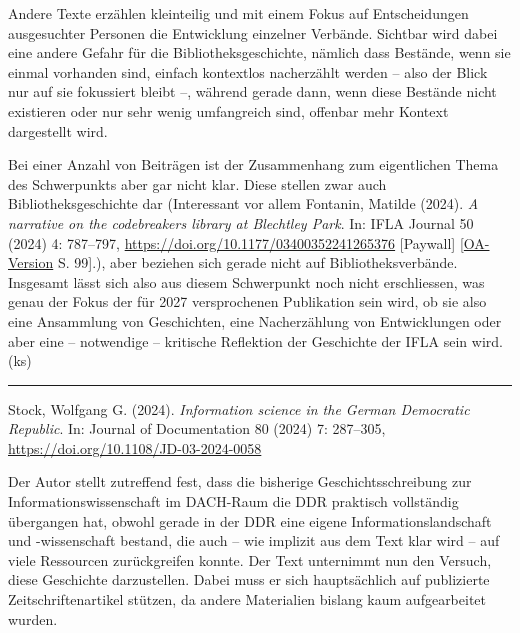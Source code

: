 \documentclass[a4paper,
fontsize=11pt,
oneside,
numbers=noperiodatend,
parskip=half-,
bibliography=totoc,
final
]{scrartcl}
\begin{document}
Andere Texte erzählen kleinteilig und mit einem Fokus auf Entscheidungen
ausgesuchter Personen die Entwicklung einzelner Verbände. Sichtbar wird
dabei eine andere Gefahr für die Bibliotheksgeschichte, nämlich dass
Bestände, wenn sie einmal vorhanden sind, einfach kontextlos nacherzählt
werden -- also der Blick nur auf sie fokussiert bleibt --, während
gerade dann, wenn diese Bestände nicht existieren oder nur sehr wenig
umfangreich sind, offenbar mehr Kontext dargestellt wird.

Bei einer Anzahl von Beiträgen ist der Zusammenhang zum eigentlichen
Thema des Schwerpunkts aber gar nicht klar. Diese stellen zwar auch
Bibliotheksgeschichte dar (Interessant vor allem Fontanin, Matilde
(2024). \emph{A narrative on the codebreakers\textquotesingle{} library
at Blechtley Park}. In: IFLA Journal 50 (2024) 4: 787--797,
\url{https://doi.org/10.1177/03400352241265376} {[}Paywall{]}
{[}\href{https://repository.ifla.org/handle/20.500.14598/3703}{OA-Version}
S. 99{]}.), aber beziehen sich gerade nicht auf Bibliotheksverbände.
Insgesamt lässt sich also aus diesem Schwerpunkt noch nicht
erschliessen, was genau der Fokus der für 2027 versprochenen Publikation
sein wird, ob sie also eine Ansammlung von Geschichten, eine
Nacherzählung von Entwicklungen oder aber eine -- notwendige --
kritische Reflektion der Geschichte der IFLA sein wird. (ks)

\begin{center}\rule{0.5\linewidth}{0.5pt}\end{center}

Stock, Wolfgang G. (2024). \emph{Information science in the German
Democratic Republic}. In: Journal of Documentation 80 (2024) 7:
287--305, \url{https://doi.org/10.1108/JD-03-2024-0058}

Der Autor stellt zutreffend fest, dass die bisherige
Geschichtsschreibung zur Informationswissenschaft im DACH-Raum die DDR
praktisch vollständig übergangen hat, obwohl gerade in der DDR eine
eigene Informationslandschaft und -wissenschaft bestand, die auch -- wie
implizit aus dem Text klar wird -- auf viele Ressourcen zurückgreifen
konnte. Der Text unternimmt nun den Versuch, diese Geschichte
darzustellen. Dabei muss er sich hauptsächlich auf publizierte
Zeitschriftenartikel stützen, da andere Materialien bislang kaum
aufgearbeitet wurden.
\end{document}
